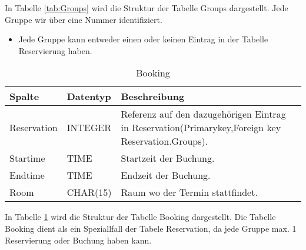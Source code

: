 \documentclass[10pt,a4paper]{article}
\begin{document}
In Tabelle \ref{tab:Groups} wird die Struktur der Tabelle Groups dargestellt. Jede Gruppe wir über eine Nummer identifiziert.

\begin{itemize}
	\item Jede Gruppe kann entweder einen oder keinen Eintrag in der Tabelle Reservierung haben. 
\end{itemize}

\begin{table}[h]
\centering
\caption{Booking}
	\label{tab:Booking}
    \begin{tabular}{| l | l | l | l |}
    \hline
    \rowcolor{lightgray} Spalte & Datentyp & Beschreibung  \\ \hline
    Reservation  & INTEGER & Referenz auf den dazugehörigen Eintrag in Reservation(Primarykey,Foreign key Reservation.Groups). \\ \hline
    Startime & TIME & Startzeit der Buchung. \\ \hline
    Endtime & TIME & Endzeit der Buchung. \\ \hline
    Room & CHAR(15) & Raum wo der Termin stattfindet. \\ \hline
    \end{tabular}
\end{table}

In Tabelle \ref{tab:Booking} wird die Struktur der Tabelle Booking dargestellt. Die Tabelle Booking dient als ein Speziallfall der Tabele Reservation, da jede Gruppe max. 1 Reservierung oder Buchung haben kann.
\end{document}
